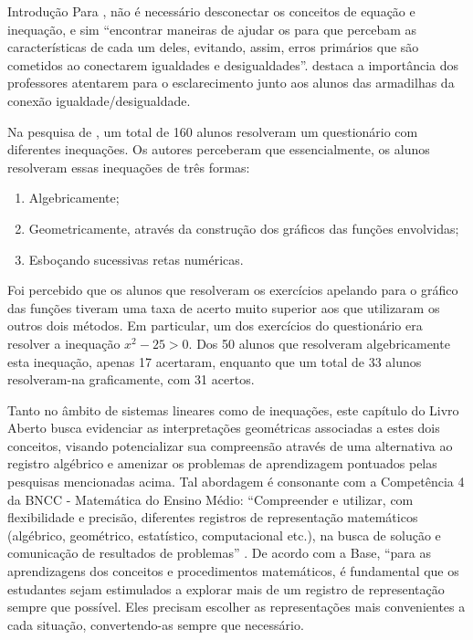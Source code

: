 \begin{apresentacao}{Introdução}
Para \cite{Lourenco2018}, não é necessário desconectar os conceitos de equação e inequação, e sim “encontrar maneiras de ajudar os para que percebam as características de cada um deles, evitando, assim, erros primários que são cometidos ao conectarem igualdades e desigualdades”. \cite{Kieran2004} destaca a importância dos professores atentarem para o esclarecimento junto aos alunos das armadilhas da conexão igualdade/desigualdade.

Na pesquisa de \cite{Tsamir2001}, um total de 160 alunos resolveram um questionário com diferentes inequações. Os autores perceberam que essencialmente, os alunos resolveram essas inequações de três formas: 
\begin{enumerate}[label=\titem{\roman*)}]
\item Algebricamente;
\item Geometricamente, através da construção dos gráficos das funções envolvidas;
\item Esboçando sucessivas retas numéricas.     
\end{enumerate} 


Foi percebido que os alunos que resolveram os exercícios apelando para o gráfico das funções tiveram uma taxa de acerto muito superior aos que utilizaram os outros dois métodos. Em particular, um dos exercícios do questionário era resolver a inequação $x^2 - 25 > 0$. Dos 50 alunos que resolveram algebricamente esta inequação, apenas 17 acertaram, enquanto que um total de 33 alunos resolveram-na graficamente, com 31 acertos. 

Tanto no âmbito de sistemas lineares como de inequações, este capítulo do Livro Aberto busca evidenciar as interpretações geométricas associadas a estes dois conceitos, visando potencializar sua compreensão através de uma alternativa ao registro algébrico e amenizar os problemas de aprendizagem pontuados pelas pesquisas mencionadas acima. Tal abordagem é consonante com a Competência 4 da BNCC - Matemática do Ensino Médio: “Compreender e utilizar, com flexibilidade e precisão, diferentes registros de representação matemáticos (algébrico, geométrico, estatístico, computacional etc.), na busca de solução e comunicação de resultados de problemas”{} \citep{BNCC2018}. De acordo com a Base, “para as aprendizagens dos conceitos e procedimentos matemáticos, é fundamental que os estudantes sejam estimulados a explorar mais de um registro de representação sempre que possível. Eles precisam escolher as representações mais convenientes a cada situação, convertendo-as sempre que necessário.  


\end{apresentacao}
